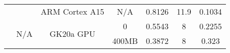 \begin{table}[H]
\begin{center}
\begin{tabular}[center]{ | c | c | c | c | c | c | c | }
                                  &                       & ARM Cortex A15              & N/A     & 0.8126  & 11.9    & 0.1034  \\ \cline{2-7}
                                  & \multirow{2}{*}{N/A}  & \multirow{2}{*}{GK20a GPU}  & 0       & 0.5543  & 8       & 0.2255  \\ \cline{4-7}
                                  &                       &                             & 400MB   & 0.3872  & 8       & 0.323   \\
      \hline
    \end{tabular}
  \end{center}
\end{table}



